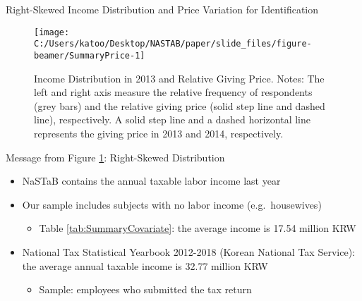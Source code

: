 \documentclass[
  ignorenonframetext,
  aspectratio=169,
]{beamer}
\providecommand{\tightlist}{%
  \setlength{\itemsep}{0pt}\setlength{\parskip}{0pt}}
\begin{document}
\begin{frame}{Right-Skewed Income Distribution and Price Variation for Identification}
\protect\hypertarget{right-skewed-income-distribution-and-price-variation-for-identification}{}
\begin{figure}[t]

{\centering \texttt{[image: C:/Users/katoo/Desktop/NASTAB/paper/slide\_files/figure-beamer/SummaryPrice-1]} 

}

\caption{Income Distribution in 2013 and Relative Giving Price. Notes: The left and right axis measure the relative frequency of respondents (grey bars) and the relative giving price (solid step line and dashed line), respectively. A solid step line and a dashed horizontal line represents the giving price in 2013 and 2014, respectively.}\label{fig:SummaryPrice}
\end{figure}
\end{frame}

\begin{frame}{Message from Figure \ref{fig:SummaryPrice}: Right-Skewed Distribution}
\protect\hypertarget{message-from-figure-reffigsummaryprice-right-skewed-distribution}{}
\begin{itemize}
\tightlist
\item
  NaSTaB contains the annual taxable labor income last year
\item
  Our sample includes subjects with no labor income (e.g.~housewives)

  \begin{itemize}
  \tightlist
  \item
    Table \ref{tab:SummaryCovariate}: the average income is 17.54 million KRW
  \end{itemize}
\item
  National Tax Statistical Yearbook 2012-2018 (Korean National Tax Service): the average annual taxable income is 32.77 million KRW

  \begin{itemize}
  \tightlist
  \item
    Sample: employees who submitted the tax return
  \end{itemize}
\end{itemize}
\end{frame}
\end{document}
